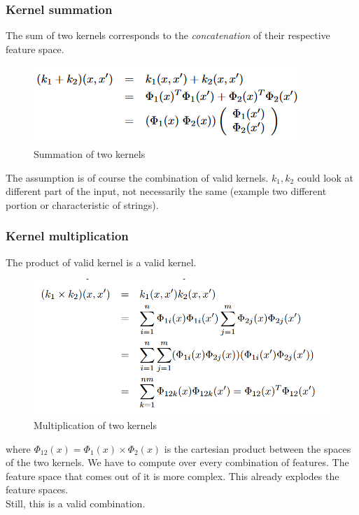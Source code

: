         \subsubsection{Kernel summation}
            The sum of two kernels corresponds to the \textit{concatenation} of their respective feature space.
            \begin{figure}[ht]
                \centering
                \includegraphics[scale=0.7]{images/kernel_sum.png}
                \caption{Summation of two kernels}
                \label{fig:kernel_sum}
            \end{figure}
            The assumption is of course the combination of valid kernels. 
            $k_1, k_2$ could look at different part of the input, not necessarily the same (example two different portion or characteristic of strings).

        \subsubsection{Kernel multiplication}
            The product of valid kernel is a valid kernel. 
            \begin{figure}[ht]
                \centering
                \includegraphics[scale=0.4]{images/kernel_mul.png}
                \caption{Multiplication of two kernels}
                \label{fig:kernel_mul}
            \end{figure}
            where $\Phi_{12}(x) = \Phi_1 (x) \times \Phi_2 (x)$ is the cartesian product between the spaces of the two kernels.
            We have to compute over every combination of features. The feature space that comes out of it is more complex. This already explodes the feature spaces. \\
            Still, this is a valid combination. 


